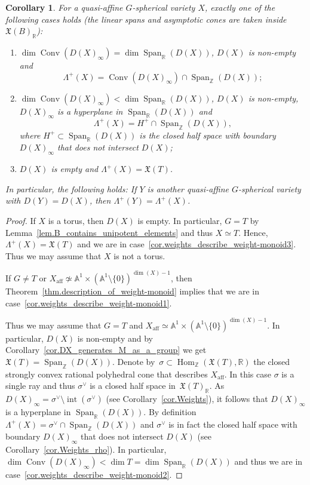 \documentclass[11pt]{article}
\numberwithin{equation}{section}
\let\oldvee\vee
\renewcommand{\vee}{{\scriptscriptstyle\oldvee}}
\theoremstyle{plain}
\newtheorem{corollary}[theorem]{Corollary}
\theoremstyle{definition}
\DeclareMathOperator{\Hom}{Hom}
\DeclareMathOperator{\aff}{aff}
\DeclareMathOperator{\Conv}{Conv}
\DeclareMathOperator{\Span}{Span}
\DeclareMathOperator{\inter}{int}
\newcommand{\RR}{\mathbb{R}}
\newcommand{\ZZ}{\mathbb{Z}}
\renewcommand{\AA}{\mathbb{A}}
\begin{document}
\begin{corollary}
\label{cor.weights_describe_weight-monoid}
For a quasi-affine $G$-spherical variety $X$, exactly one of the following cases holds
(the linear spans and asymptotic cones are taken inside $\mathfrak{X}(B)_{\RR}$):
\begin{enumerate}
\item \label{cor.weights_describe_weight-monoid1}
$\dim \Conv(D(X)_{\infty}) = \dim \Span_{\RR}(D(X))$, $D(X)$ is non-empty and
\[
\Lambda^+(X) = \Conv ( D(X)_{\infty}) \cap \Span_{\ZZ}(D(X));
\]
\item \label{cor.weights_describe_weight-monoid2}
$\dim \Conv(D(X)_{\infty}) < \dim \Span_{\RR}(D(X))$, $D(X)$ is non-empty,
$D(X)_{\infty}$ is a hyperplane in $\Span_{\RR}(D(X))$ and
\[
\Lambda^+(X) = H^+ \cap \Span_{\ZZ}(D(X)),
\]
where $H^+ \subset \Span_{\RR}(D(X))$
is the closed half space with boundary $D(X)_{\infty}$
that does not intersect $D(X)$;
\item \label{cor.weights_describe_weight-monoid3}
$D(X)$ is empty and $\Lambda^+(X) = \mathfrak{X}(T)$.
\end{enumerate}
In particular, the following holds:
If $Y$ is another quasi-affine $G$-spherical variety with $D(Y) = D(X)$, then
$\Lambda^+(Y) = \Lambda^+(X)$.
\end{corollary}

\begin{proof}
If $X$ is a torus, then $D(X)$ is empty. In particular, $G = T$ by Lemma~\ref{lem.B_contains_unipotent_elements} and thus $X \simeq T$. Hence, $\Lambda^+(X) = \mathfrak{X}(T)$ and we are
in case~\eqref{cor.weights_describe_weight-monoid3}. Thus we may assume that $X$ is not a torus.

If $G \neq T$ or $X_{\aff} \not\simeq \AA^1 \times (\AA^1 \setminus \{0\})^{\dim(X)-1}$, then
Theorem~\ref{thm.description_of_weight-monoid} implies that we
are in case~\eqref{cor.weights_describe_weight-monoid1}.

Thus we may assume that $G = T$ and
$X_{\aff} \simeq \AA^1 \times (\AA^1 \setminus \{0\})^{\dim(X)-1}$. In particular, $D(X)$ is non-empty
and by Corollary~\ref{cor.DX_generates_M_as_a_group} we get $\mathfrak{X}(T) = \Span_{\ZZ}(D(X))$.
Denote by~$\sigma \subset \Hom_{\ZZ}(\mathfrak{X}(T), \RR)$ the closed strongly
convex rational polyhedral cone that describes $X_{\aff}$.
In this case $\sigma$ is a single ray and thus
$\sigma^\vee$ is a closed half space in~$\mathfrak{X}(T)_\RR$.
As $D(X)_\infty = \sigma^\vee \setminus \inter(\sigma^\vee)$ (see Corollary~\ref{cor.Weights}),
it follows that $D(X)_\infty$ is a hyperplane in $\Span_{\RR}(D(X))$.
By definition $\Lambda^+(X) = \sigma^\vee \cap \Span_{\ZZ}(D(X))$ and
$\sigma^\vee$ is in fact the closed half space with boundary
$D(X)_\infty$ that does not intersect $D(X)$ (see Corollary~\ref{cor.Weights_rho}).
In particular, $\dim \Conv(D(X)_\infty) < \dim T = \dim \Span_{\RR}(D(X))$
and thus we are in case~\eqref{cor.weights_describe_weight-monoid2}.
\end{proof}
\end{document}
